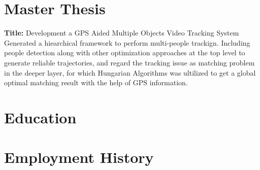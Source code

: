 \documentclass[10pt]{article} %
\begin{document}
\section{Master Thesis}

\textbf{Title:}  Development a GPS Aided Multiple Objects Video Tracking System\\

Generated a hiearchical framework to perform multi-people trackign. Including people detection along with other optimization approaches at the top level to generate reliable trajectories, and regard the tracking issue as matching problem in the deeper layer, for which Hungarian Algorithms was ultilized to get a global optimal matching result with the help of GPS information.\\



\section{Education}





\section{Employment History}
\end{document}
